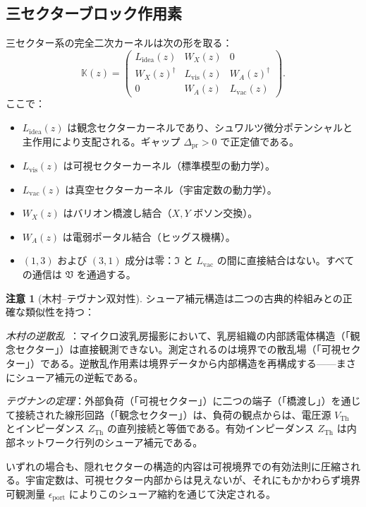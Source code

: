 \documentclass[12pt]{article}
\theoremstyle{plain}
\theoremstyle{definition}
\newtheorem{remark}[theorem]{注意}
\numberwithin{equation}{section}
\newcommand{\fI}{\mathfrak{I}}
\newcommand{\fV}{\mathfrak{V}}
\newcommand{\pr}{\mathrm{pr}}
\newcommand{\vis}{\mathrm{vis}}
\newcommand{\idea}{\mathrm{idea}}
\begin{document}
\subsection{三セクターブロック作用素}

三セクター系の完全二次カーネルは次の形を取る：
\begin{equation}
\mathbb{K}(z) = \begin{pmatrix}
L_{\idea}(z) & W_X(z) & 0\\
W_X(z)^\dagger & L_{\vis}(z) & W_A(z)^\dagger\\
0 & W_A(z) & L_{\mathrm{vac}}(z)
\end{pmatrix}.
\end{equation}
ここで：
\begin{itemize}
\item $L_{\idea}(z)$ は観念セクターカーネルであり、シュワルツ微分ポテンシャルと主作用により支配される。ギャップ $\Delta_{\pr}>0$ で正定値である。
\item $L_{\vis}(z)$ は可視セクターカーネル（標準模型の動力学）。
\item $L_{\mathrm{vac}}(z)$ は真空セクターカーネル（宇宙定数の動力学）。
\item $W_X(z)$ はバリオン橋渡し結合（$X,Y$ ボソン交換）。
\item $W_A(z)$ は電弱ポータル結合（ヒッグス機構）。
\item $(1,3)$ および $(3,1)$ 成分は零：$\fI$ と $L_{\mathrm{vac}}$ の間に直接結合はない。すべての通信は $\fV$ を通過する。
\end{itemize}

\begin{remark}[木村--テヴナン双対性]
シューア補元構造は二つの古典的枠組みとの正確な類似性を持つ：

\emph{木村の逆散乱}~\cite{Kimura2020,Kimura2021,Kimura2022}：マイクロ波乳房撮影において、乳房組織の内部誘電体構造（「観念セクター」）は直接観測できない。測定されるのは境界での散乱場（「可視セクター」）である。逆散乱作用素は境界データから内部構造を再構成する——まさにシューア補元の逆転である。

\emph{テヴナンの定理}：外部負荷（「可視セクター」）に二つの端子（「橋渡し」）を通じて接続された線形回路（「観念セクター」）は、負荷の観点からは、電圧源 $V_{\mathrm{Th}}$ とインピーダンス $Z_{\mathrm{Th}}$ の直列接続と等価である。有効インピーダンス $Z_{\mathrm{Th}}$ は内部ネットワーク行列のシューア補元である。

いずれの場合も、隠れセクターの構造的内容は可視境界での有効法則に圧縮される。宇宙定数は、可視セクター内部からは見えないが、それにもかかわらず境界可観測量 $\epsilon_{\mathrm{port}}$ によりこのシューア縮約を通じて決定される。
\end{remark}
\end{document}
